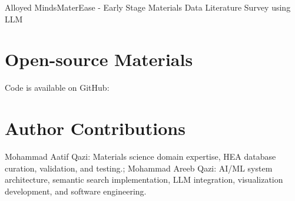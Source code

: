 \begin{teamsubmission}{Alloyed Minds}{MaterEase - Early Stage Materials Data Literature Survey using LLM}
\section*{Open-source Materials}
Code is available on GitHub: 

\section*{Author Contributions}
Mohammad Aatif Qazi: Materials science domain expertise, HEA database curation, validation, and testing.; Mohammad Areeb Qazi: AI/ML system architecture, semantic search implementation, LLM integration, visualization development, and software engineering.
\end{teamsubmission}




